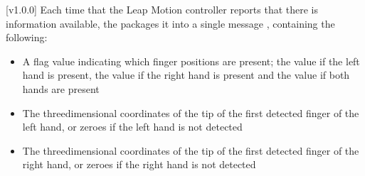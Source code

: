 [v1.0.0]
Each time that the Leap Motion controller reports that there is information available,
the  packages it into a single message
\openSq{}\closeSq, containing the following:
\begin{itemize}
\item A flag value indicating which finger positions are present; the value  if
the left hand is present, the value  if the right hand is present and the value
 if both hands are present
\item\exSp{}The three\longDash{}dimensional coordinates of the tip of the first detected
finger of the left hand, or zeroes if the left hand is not detected
\item\exSp{}The three\longDash{}dimensional coordinates of the tip of the first detected
finger of the right hand, or zeroes if the right hand is not detected
\end{itemize}
\appendixEnd{}
